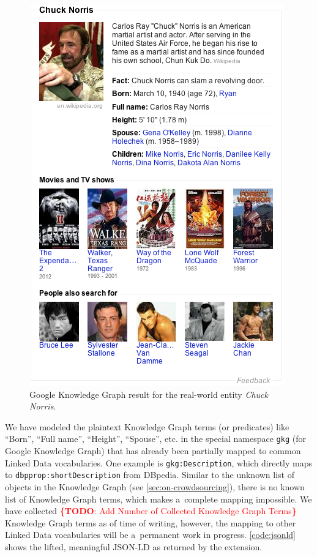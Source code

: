 \documentclass[runningheads,a4paper]{llncs}
\newcommand{\todo}[1]{\noindent\textcolor{red}{{\bf \{TODO}: #1{\bf \}}}}
\begin{document}
\begin{figure}[htb!]
  \begin{center}
   \includegraphics[width=0.5\linewidth]{./screenshot.png}
  \end{center}  
  \caption{Google Knowledge Graph result for the real-world entity \emph{Chuck Norris}.}
  \label{fig:screenshot}
\end{figure}

We have modeled the plaintext Knowledge Graph terms (or predicates)
like ``Born'', ``Full name'', ``Height'', ``Spouse'', etc.
in the special namespace \texttt{gkg} (for Google Knowledge Graph)
that has already been partially mapped to common Linked Data vocabularies.
One example is \texttt{gkg:Description},
which directly maps to \texttt{dbpprop:shortDescription} from DBpedia.
Similar to the unknown list of objects in the Knowledge Graph (see \autoref{sec:on-crowdsourcing}),
there is no known list of Knowledge Graph terms,
which makes a~complete mapping impossible.
We have collected \todo{Add Number of Collected Knowledge Graph Terms} Knowledge Graph terms
as of time of writing, however, the mapping to other Linked Data vocabularies
will be a~permanent work in progress.
\autoref{code:jsonld} shows the lifted, meaningful JSON-LD as returned by the extension.
\end{document}
